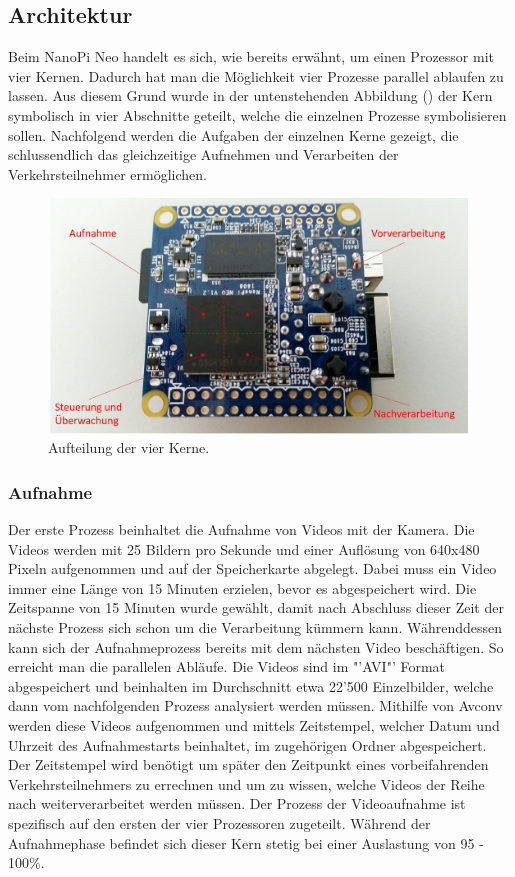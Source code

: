 \subsection{Architektur}
Beim NanoPi Neo handelt es sich, wie bereits erwähnt, um einen Prozessor mit vier Kernen. Dadurch hat man die Möglichkeit vier Prozesse parallel ablaufen zu lassen. Aus diesem Grund wurde in der untenstehenden Abbildung () der Kern symbolisch in vier Abschnitte geteilt, welche die einzelnen Prozesse symbolisieren sollen. Nachfolgend werden die Aufgaben der einzelnen Kerne gezeigt, die schlussendlich das gleichzeitige Aufnehmen und Verarbeiten der Verkehrsteilnehmer ermöglichen.

\begin{figure}[H]
  \centering
  \includegraphics[width=0.99\textwidth]{Software/Architektur.jpg} 
  \caption{Aufteilung der vier Kerne.}
  \label{bArchitektur}
\end{figure}


\subsubsection{Aufnahme}
Der erste Prozess beinhaltet die Aufnahme von Videos mit der Kamera. Die Videos werden mit 25 Bildern pro Sekunde und einer Auflösung von 640x480 Pixeln aufgenommen und auf der Speicherkarte abgelegt. Dabei muss ein Video immer eine Länge von 15 Minuten erzielen, bevor es abgespeichert wird. Die Zeitspanne von 15 Minuten wurde gewählt, damit nach Abschluss dieser Zeit der nächste Prozess sich schon um die Verarbeitung kümmern kann. Währenddessen kann sich der Aufnahmeprozess bereits mit dem nächsten Video beschäftigen. So erreicht man die parallelen Abläufe. Die Videos sind im "'AVI"' Format abgespeichert und beinhalten im Durchschnitt etwa 22'500 Einzelbilder, welche dann vom nachfolgenden Prozess analysiert werden müssen. Mithilfe von Avconv werden diese Videos aufgenommen und mittels Zeitstempel, welcher Datum und Uhrzeit des Aufnahmestarts beinhaltet, im zugehörigen Ordner abgespeichert. Der Zeitstempel wird benötigt um später den Zeitpunkt eines vorbeifahrenden Verkehrsteilnehmers zu errechnen und um zu wissen, welche Videos der Reihe nach weiterverarbeitet werden müssen. Der Prozess der Videoaufnahme ist spezifisch auf den ersten der vier Prozessoren zugeteilt. Während der Aufnahmephase befindet sich dieser Kern stetig bei einer Auslastung von 95 - 100\%.

